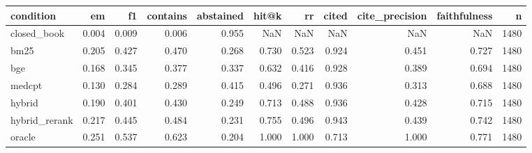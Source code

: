 \begin{tabular}{lrrrrrrrrrr}
\toprule
condition & em & f1 & contains & abstained & hit@k & rr & cited & cite_precision & faithfulness & n \\
\midrule
closed_book & 0.004 & 0.009 & 0.006 & 0.955 & NaN & NaN & NaN & NaN & NaN & 1480 \\
bm25 & 0.205 & 0.427 & 0.470 & 0.268 & 0.730 & 0.523 & 0.924 & 0.451 & 0.727 & 1480 \\
bge & 0.168 & 0.345 & 0.377 & 0.337 & 0.632 & 0.416 & 0.928 & 0.389 & 0.694 & 1480 \\
medcpt & 0.130 & 0.284 & 0.289 & 0.415 & 0.496 & 0.271 & 0.936 & 0.313 & 0.688 & 1480 \\
hybrid & 0.190 & 0.401 & 0.430 & 0.249 & 0.713 & 0.488 & 0.936 & 0.428 & 0.715 & 1480 \\
hybrid_rerank & 0.217 & 0.445 & 0.484 & 0.231 & 0.755 & 0.496 & 0.943 & 0.439 & 0.742 & 1480 \\
oracle & 0.251 & 0.537 & 0.623 & 0.204 & 1.000 & 1.000 & 0.713 & 1.000 & 0.771 & 1480 \\
\bottomrule
\end{tabular}
